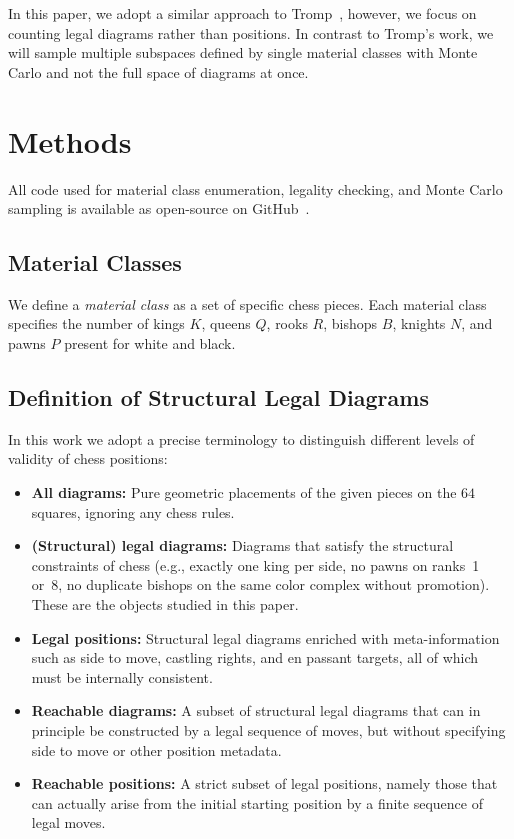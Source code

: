 \documentclass[12pt]{article}
\begin{document}
In this paper, we adopt a similar approach to Tromp~\cite{tromp2021b}, however, we focus on counting legal diagrams rather than positions. In contrast to Tromp's work, we will sample multiple subspaces defined by single material classes with Monte Carlo and not the full space of diagrams at once.


\section{Methods}
All code used for material class enumeration, legality checking, and Monte Carlo sampling 
is available as open-source on GitHub~\cite{repo}.

\subsection{Material Classes}

We define a \emph{material class} as a set of specific chess pieces. Each material class specifies the number of kings $K$, queens $Q$, rooks $R$, bishops $B$, knights $N$, and pawns $P$ present for white and black.

\subsection{Definition of Structural Legal Diagrams}

In this work we adopt a precise terminology to distinguish different levels of validity of chess positions:

\begin{itemize}
    \item \textbf{All diagrams:} Pure geometric placements of the given pieces on the $64$ squares, ignoring any chess rules.
    \item \textbf{(Structural) legal diagrams:} Diagrams that satisfy the structural constraints of chess (e.g., exactly one king per side, no pawns on ranks~1 or~8, no duplicate bishops on the same color complex without promotion). These are the objects studied in this paper.
    \item \textbf{Legal positions:} Structural legal diagrams enriched with meta-information such as side to move, castling rights, and en passant targets, all of which must be internally consistent.
    \item \textbf{Reachable diagrams:} A subset of structural legal diagrams that can in principle be constructed by a legal sequence of moves, but without specifying side to move or other position metadata.
    \item \textbf{Reachable positions:} A strict subset of legal positions, namely those that can actually arise from the initial starting position by a finite sequence of legal moves.
\end{itemize}
\end{document}
